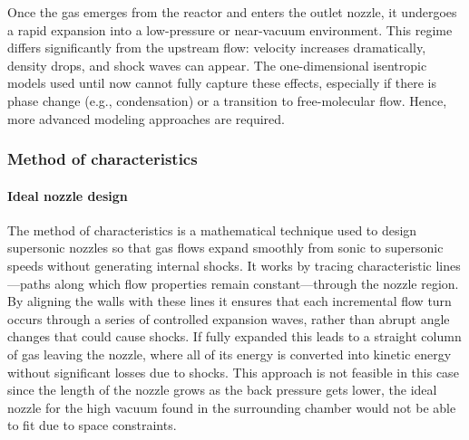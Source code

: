 Once the gas emerges from the reactor and enters the outlet nozzle, it undergoes a rapid expansion into a low-pressure or near-vacuum environment.
This regime differs significantly from the upstream flow: velocity increases dramatically, density drops, and shock waves can appear.
The one-dimensional isentropic models used until now cannot fully capture these effects, especially if there is phase change (e.g., condensation) or a transition to free-molecular flow.
Hence, more advanced modeling approaches are required.
\cite{jousten_handbook_2016, anderson2021modern}

\subsubsection*{Method of characteristics}

	\paragraph*{Ideal nozzle design}
		The method of characteristics is a mathematical technique used to design supersonic nozzles so that gas flows expand smoothly from sonic to supersonic speeds without generating internal shocks.
		It works by tracing characteristic lines—paths along which flow properties remain constant—through the nozzle region.
		By aligning the walls with these lines it ensures that each incremental flow turn occurs through a series of controlled expansion waves, rather than abrupt angle changes that could cause shocks.
		If fully expanded this leads to a straight column of gas leaving the nozzle, where all of its energy is converted into kinetic energy without significant losses due to shocks.
		This approach is not feasible in this case since the length of the nozzle grows as the back pressure gets lower, the ideal nozzle for the high vacuum found in the surrounding chamber would not be able to fit due to space constraints.
		\cite{khare_rocket_2021, fernandes_shape_2023}

